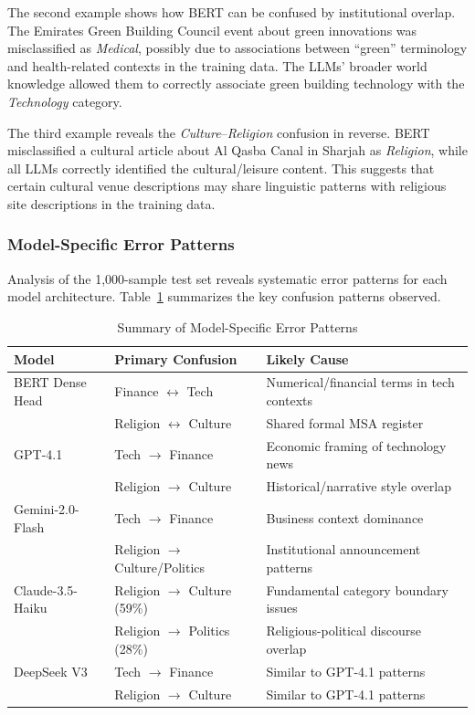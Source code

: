 \documentclass[preprint,12pt,authoryear]{elsarticle}
\begin{document}
The second example shows how BERT can be confused by institutional overlap. The Emirates Green Building Council event about green innovations was misclassified as \textit{Medical}, possibly due to associations between ``green'' terminology and health-related contexts in the training data. The LLMs' broader world knowledge allowed them to correctly associate green building technology with the \textit{Technology} category.

The third example reveals the \textit{Culture}--\textit{Religion} confusion in reverse. BERT misclassified a cultural article about Al Qasba Canal in Sharjah as \textit{Religion}, while all LLMs correctly identified the cultural/leisure content. This suggests that certain cultural venue descriptions may share linguistic patterns with religious site descriptions in the training data.

\subsubsection{Model-Specific Error Patterns}

Analysis of the 1,000-sample test set reveals systematic error patterns for each model architecture. Table~\ref{tab:error-summary} summarizes the key confusion patterns observed.

\begin{table}[h!]
    \centering
    \caption{Summary of Model-Specific Error Patterns}
    \label{tab:error-summary}
    \small
    \begin{tabular}{lll}
        \toprule
        \textbf{Model} & \textbf{Primary Confusion} & \textbf{Likely Cause} \\
        \midrule
        BERT Dense Head & Finance $\leftrightarrow$ Tech & Numerical/financial terms in tech contexts \\
        & Religion $\leftrightarrow$ Culture & Shared formal MSA register \\
        \addlinespace
        GPT-4.1 & Tech $\rightarrow$ Finance & Economic framing of technology news \\
        & Religion $\rightarrow$ Culture & Historical/narrative style overlap \\
        \addlinespace
        Gemini-2.0-Flash & Tech $\rightarrow$ Finance & Business context dominance \\
        & Religion $\rightarrow$ Culture/Politics & Institutional announcement patterns \\
        \addlinespace
        Claude-3.5-Haiku & Religion $\rightarrow$ Culture (59\%) & Fundamental category boundary issues \\
        & Religion $\rightarrow$ Politics (28\%) & Religious-political discourse overlap \\
        \addlinespace
        DeepSeek V3 & Tech $\rightarrow$ Finance & Similar to GPT-4.1 patterns \\
        & Religion $\rightarrow$ Culture & Similar to GPT-4.1 patterns \\
        \bottomrule
    \end{tabular}
\end{table}
\end{document}
